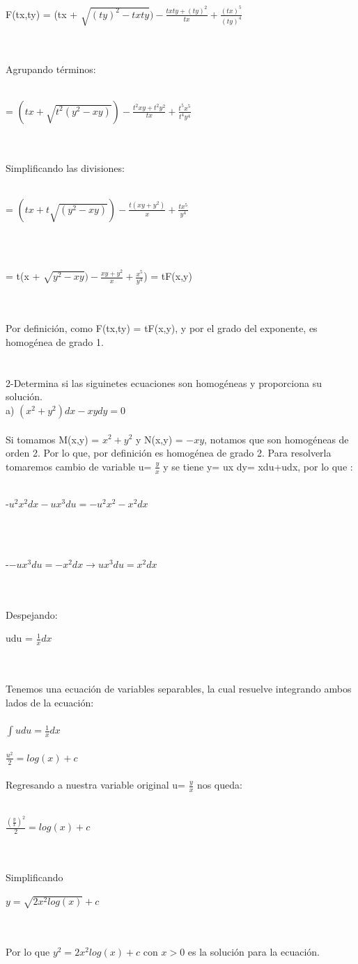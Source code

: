 \documentclass[a4paper,10pt]{article}
\begin{document}
\centerline{ F(tx,ty) = (tx + $\sqrt{(ty)^2 - txty}) - \frac{txty + (ty)^2 }{tx} + \frac{(tx)^5}{(ty)^4}$}\\\\
Agrupando términos:\\\\
\centerline{ = $(tx + \sqrt{t^2(y^2 - xy)}) - \frac{t^2xy + t^2y^2 }{tx} + \frac{t^5x^5}{t^4y^4}$}\\\\
Simplificando las divisiones:\\\\
\centerline{= $(tx + t\sqrt{(y^2 - xy)}) - \frac{t(xy + y^2) }{x} + \frac{tx^5}{y^4}$}\\\\
\centerline{ = t(x + $\sqrt{y^2 - xy}) - \frac{xy + y^2 }{x} + \frac{x^5}{y^4}$) = tF(x,y)}\\\\
Por definición, como F(tx,ty) = tF(x,y), y por el grado del exponente, es homogénea de grado 1.\\\\\\
2-Determina si las siguinetes ecuaciones son homogéneas y
proporciona su solución.\\
a) $(x^2 + y^2 ) dx - xydy = 0$\\\\
Si tomamos M(x,y) = $x^2 + y^2$ y N(x,y) = $ -xy$, notamos que son homogéneas de orden 2. 
Por lo que, por definición es homogénea de grado 2. Para resolverla tomaremos cambio de variable u= $\frac{y}{x}$ y se tiene y= ux dy= xdu+udx, por lo que :\\\\
\centerline{ -$u^2x^2dx - u x^3 du = -u^2x^2 -x^2dx$ }\\\\ 
\centerline{-$ - u x^3 du = -x^2dx \rightarrow ux^3 du =  x^2 dx$ }\\\\
Despejando:\\
\centerline{udu = $\frac{1}{x}dx$}\\\\
Tenemos una ecuación de variables separables, la cual resuelve integrando ambos lados de la ecuación:\\\\
$\int u du = \frac{1}{x} dx $\\\\
$ \frac{u^2}{2} = log(x) +c $\\\\
Regresando a nuestra variable original u= $\frac{y}{x}$ nos queda:\\\\
\centerline{$ \frac{(\frac{y}{x})^2}{2} = log(x) +c$}\\\\
Simplificando\\
\centerline{$ y = \sqrt{2x^2 log(x)} + c$}\\\\
Por lo que $ y^2 = 2x^2 log(x) + c$ con $x>0$ es la solución para la ecuación.\\\\\\
\end{document}

